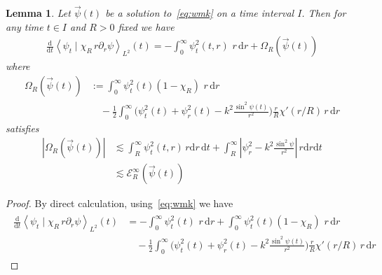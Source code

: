 \documentclass[10pt,reqno]{amsart}
\newcommand{\E}{\mathcal{E}}
\newcommand{\Om}{\Omega}
\newcommand{\p}{\partial}
\newcommand{\ang}[1]{\left\langle{#1}\right\rangle}
\newcommand{\abs}[1]{\left\lvert{#1}\right\rvert}
\newcommand{\ant}[1]{\begin{align*}\begin{split} #1 \end{split}\end{align*}}
\newcommand{\EQ}[1]{\begin{equation}\begin{split} #1 \end{split}\end{equation}}
\numberwithin{equation}{section}
\newtheorem{lem}[thm]{Lemma}
\theoremstyle{remark}
\newcommand{\rdr}{ \, r \, \mathrm{d}r}
\newcommand{\ud}{\mathrm{d}}
\newcommand{\0}{\emptyset}
\begin{document}
 \begin{lem} \label{l:vir} 
 Let $\vec \psi(t)$ be a solution to~\eqref{eq:wmk} on a time interval $I$. Then for any time $t \in I$  and $R>0$ fixed we have 
 \EQ{\label{eq:vir}
 \frac{\ud}{\ud t} \ang{ \psi_t \mid \chi_R \, r \p_r \psi}_{L^2}(t)  = - \int_0^\infty \psi_t^2(t, r) \, \rdr + \Om_R(\vec \psi(t))
 }
 where 
 \EQ{ \label{eq:OmRdef} 
 \Om_R(\vec \psi(t)) &:=  \int_0^\infty \psi_t^2(t)(1 - \chi_R) \, \rdr   \\
 & \quad -\frac{1}{2} \int_0^\infty  \Big( \psi_t^2(t) + \psi_r^2(t) - k^2 \frac{\sin^2 \psi(t)}{r^2} \Big)   \frac{r}{R} \chi'(r/R) \rdr
 }
 satisfies 
 \EQ{ \label{eq:OmRest} 
 \abs{\Om_R(\vec \psi(t))} &\lesssim \int_{R}^\infty \psi_t^2(t, r) \, r \ud r  \, \ud t + \int_{R}^{\infty} \abs{ \psi_r^2 - k^2 \frac{\sin^2 \psi}{r^2} } \,r  \ud r \ud t  \\
 &\lesssim  \E_{R}^{\infty}(\vec \psi(t))
 }
 \end{lem}
 \begin{proof}
 By direct calculation, using~\eqref{eq:wmk} we have 
 \ant{
 \frac{\ud}{\ud t} \ang{ \psi_t \mid \chi_R \, r \p_r \psi}_{L^2}(t) &=  - \int_0^\infty \psi_t^2(t) \, \rdr   + \int_0^\infty \psi_t^2(t)(1 - \chi_R) \, \rdr \\
 & \quad -\frac{1}{2} \int_0^\infty  \Big( \psi_t^2(t) + \psi_r^2(t) - k^2 \frac{\sin^2 \psi(t)}{r^2} \Big)   \frac{r}{R} \chi'(r/R) \rdr
 }
  \end{proof}
 
\end{document}
